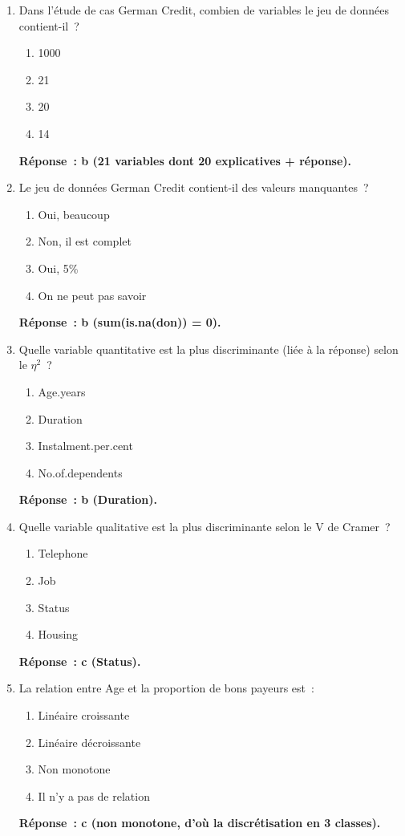 \documentclass[a4paper,11pt]{article}
\theoremstyle{definition}
\theoremstyle{remark}
\begin{document}
\begin{enumerate}

  \item Dans l'étude de cas German Credit, combien de variables
    le jeu de données contient-il~?
    \begin{enumerate}
      \item 1000
      \item 21
      \item 20
      \item 14
    \end{enumerate}
    \textbf{Réponse~: b (21 variables dont 20 explicatives + réponse).}

  \item Le jeu de données German Credit contient-il des valeurs
    manquantes~?
    \begin{enumerate}
      \item Oui, beaucoup
      \item Non, il est complet
      \item Oui, 5\%
      \item On ne peut pas savoir
    \end{enumerate}
    \textbf{Réponse~: b (sum(is.na(don)) = 0).}

  \item Quelle variable quantitative est la plus discriminante
    (liée à la réponse) selon le $\eta^2$~?
    \begin{enumerate}
      \item Age.years
      \item Duration
      \item Instalment.per.cent
      \item No.of.dependents
    \end{enumerate}
    \textbf{Réponse~: b (Duration).}

  \item Quelle variable qualitative est la plus discriminante selon
    le V de Cramer~?
    \begin{enumerate}
      \item Telephone
      \item Job
      \item Status
      \item Housing
    \end{enumerate}
    \textbf{Réponse~: c (Status).}

  \item La relation entre Age et la proportion de bons payeurs est~:
    \begin{enumerate}
      \item Linéaire croissante
      \item Linéaire décroissante
      \item Non monotone
      \item Il n'y a pas de relation
    \end{enumerate}
    \textbf{Réponse~: c (non monotone, d'où la discrétisation en 3 classes).}


\end{enumerate}
\end{document}
